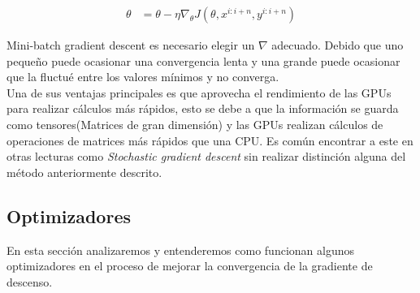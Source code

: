 \begin{equation}
\label{mbgds}
\begin{aligned}
\theta &= \theta - \eta \nabla_{\theta} J(\theta,x^{i:i+n},y^{i:i+n})
\end{aligned}
\end{equation}

Mini-batch gradient descent es necesario elegir un $\nabla$ adecuado. Debido  que uno pequeño puede ocasionar una convergencia lenta y una grande puede ocasionar que la fluctué entre los valores mínimos y no converga.\\
Una de sus ventajas principales es que aprovecha el rendimiento de las GPUs para realizar cálculos más rápidos, esto se debe a que la información se guarda como tensores(Matrices de gran dimensión) y las GPUs realizan cálculos de operaciones de matrices más rápidos que una CPU. Es común encontrar a este en otras lecturas como \textit{Stochastic gradient descent} sin realizar distinción alguna del método anteriormente descrito.

\subsection{Optimizadores}
En esta sección analizaremos y entenderemos como funcionan algunos optimizadores en el proceso de mejorar la convergencia de la gradiente de descenso.
